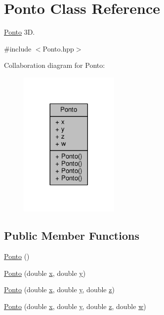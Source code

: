 \hypertarget{classPonto}{\section{Ponto Class Reference}
\label{classPonto}
}


\hyperlink{classPonto}{Ponto} 3\+D.  




{\ttfamily \#include $<$Ponto.\+hpp$>$}



Collaboration diagram for Ponto\+:
\nopagebreak
\begin{figure}[H]
\begin{center}
\leavevmode
\includegraphics[width=137pt]{classPonto__coll__graph}
\end{center}
\end{figure}
\subsection*{Public Member Functions}
\begin{DoxyCompactItemize}
\item 
\hyperlink{classPonto_a49b03b00e9ebc01c2011c25f6517b93b}{Ponto} ()
\item 
\hyperlink{classPonto_a8f85d65a4e81f86a351cc94612d31add}{Ponto} (double \hyperlink{classPonto_a19d9967c487a947f94938ce37346ed3c}{x}, double \hyperlink{classPonto_afc19597e54764ae43c0211a34adc98c8}{y})
\item 
\hyperlink{classPonto_ad55e3d41b73a92edad7527b07a71d6f0}{Ponto} (double \hyperlink{classPonto_a19d9967c487a947f94938ce37346ed3c}{x}, double \hyperlink{classPonto_afc19597e54764ae43c0211a34adc98c8}{y}, double \hyperlink{classPonto_ab5f76e914355c1bb1c5542a0a6093f5c}{z})
\item 
\hyperlink{classPonto_aec81b7e86a1d6c8cb41690fc0ab54cb4}{Ponto} (double \hyperlink{classPonto_a19d9967c487a947f94938ce37346ed3c}{x}, double \hyperlink{classPonto_afc19597e54764ae43c0211a34adc98c8}{y}, double \hyperlink{classPonto_ab5f76e914355c1bb1c5542a0a6093f5c}{z}, double \hyperlink{classPonto_afb59351a6bdb8509302ffeda9ac77091}{w})
\end{DoxyCompactItemize}
